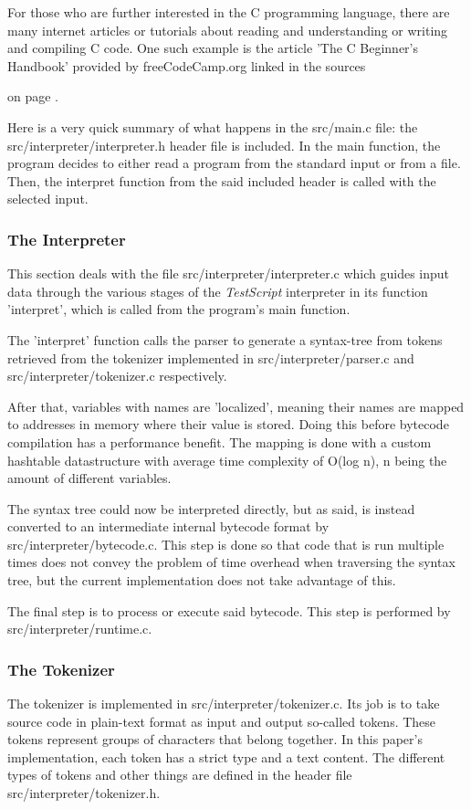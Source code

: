 \documentclass[12pt,a4paper]{article}
\newcommand{\cte}[1] {
    \cite{#1}
}
\newcommand{\name}{\emph{TestScript}}
\begin{document}
For those who are further interested in the C programming language, there are
many internet articles or tutorials about reading and understanding or
writing and compiling C code. One such example is the article 'The C Beginner's
Handbook' provided by freeCodeCamp.org linked in the sources\cte{freeCodeCamp}
on page \pageref{bibliography}.

Here is a very quick summary of what happens in the src/main.c file: the src/interpreter/interpreter.h
header file is included. In the main function, the program decides to either
read a program from the standard input or from a file. Then, the interpret function
from the said included header is called with the selected input.

\subsubsection{The Interpreter}
This section deals with the file src/interpreter/interpreter.c which guides
input data through the various stages of the \name{} interpreter in its
function 'interpret', which is called from the program's main function.

The 'interpret' function calls the parser to generate a syntax-tree from tokens retrieved
from the tokenizer implemented in src/interpreter/parser.c and 
src/interpreter/tokenizer.c respectively.

After that, variables with names are 'localized', meaning their names are
mapped to addresses in memory where their value is stored. Doing this before
bytecode compilation has a performance benefit. 
The mapping is done with a custom hashtable datastructure with average time
complexity of O(log n), n being the amount of different variables.

The syntax tree could now be interpreted directly, but as said, is instead converted
to an intermediate internal bytecode format by src/interpreter/bytecode.c.
This step is done so that code that is run multiple times does not convey
the problem of time overhead when traversing the syntax tree, but the current
implementation does not take advantage of this.

The final step is to process or execute said bytecode. This step is performed
by src/interpreter/runtime.c.

\subsubsection{The Tokenizer}
The tokenizer is implemented in src/interpreter/tokenizer.c. Its job is to
take source code in plain-text format as input and output so-called tokens.
These tokens represent groups of characters that belong together. In this paper's
implementation, each token has a strict type and a text content.
The different types of tokens and other things are defined in the header file
src/interpreter/tokenizer.h.
\end{document}
